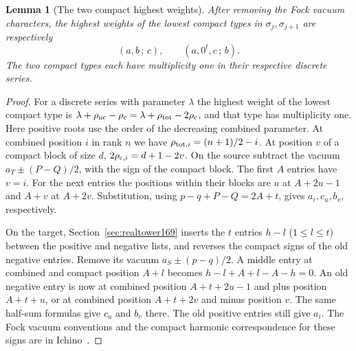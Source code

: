 \documentclass[a4paper,11pt]{article}
\newtheorem{lemma}[proposition]{Lemma}
\theoremstyle{definition}
\theoremstyle{remark}
\numberwithin{equation}{section}
\begin{document}
\begin{lemma}[The two compact highest weights]
\label{lem:harmweights187}
After removing the Fock vacuum characters, the highest weights
of the lowest compact types in \(\sigma_j,\sigma_{j+1}\) are
respectively
\[
              (a,b\,;\,c),\qquad (a,0^t,c\,;\,b).
\]
The two compact types each have multiplicity one in their
respective discrete series.
\end{lemma}
\begin{proof}
For a discrete series with parameter \(\lambda\) the highest
weight of the lowest compact type is
\(\lambda+\rho_{\rm nc}-\rho_{\rm c}=
\lambda+\rho_{\rm tot}-2\rho_{\rm c}\), and that type has
multiplicity one. Here positive roots use the order of the
decreasing combined parameter. At combined position \(i\) in
rank \(n\) we have \(\rho_{{\rm tot},i}=(n+1)/2-i\). At
position \(v\) of a compact block of size \(d\),
\(2\rho_{{\rm c},i}=d+1-2v\). On the source subtract the vacuum
\(a_T\pm(P-Q)/2\), with the sign of the compact block.
The first \(A\) entries have \(v=i\). For the next entries the
positions within their blocks are \(u\) at \(A+2u-1\) and
\(A+v\) at \(A+2v\). Substitution, using
\(p-q+P-Q=2A+t\), gives \(a_i,c_u,b_v\), respectively.

On the target, Section~\ref{sec:realtower169} inserts the \(t\)
entries \(h-l\) (\(1\le l\le t\)) between the positive and
negative lists, and reverses the compact signs of the old negative
entries. Remove its vacuum \(a_S\pm(p-q)/2\). A middle entry at
combined and compact position \(A+l\) becomes
\(h-l+A+l-A-h=0\). An old negative entry is now at combined
position \(A+t+2u-1\) and plus position \(A+t+u\), or at
combined position \(A+t+2v\) and minus position \(v\). The
same half-sum formulas give \(c_u\) and \(b_v\) there. The old
positive entries still give \(a_i\). The Fock vacuum conventions
and the compact harmonic correspondence for these signs are in
Ichino~\cite[Lemma~7.8]{XX-XV-ichino328}.
\end{proof}
\end{document}
